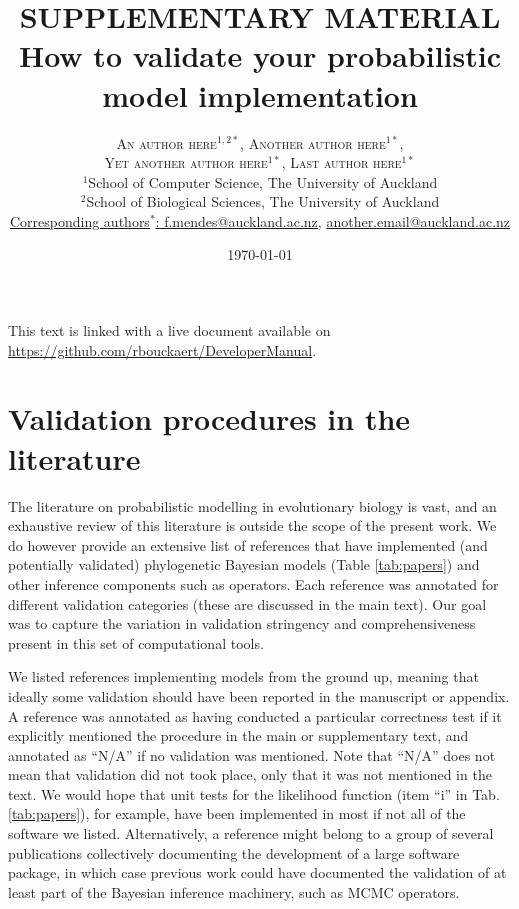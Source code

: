 \documentclass[oneside]{article}
\title{{\huge SUPPLEMENTARY MATERIAL}\\\vspace{.5cm}How to validate your probabilistic model
  implementation} %
\author{\textsc{An author here$^{1,2*}$}, \textsc{Another author
    here$^{1*}$}, \\ \textsc{Yet another author here$^{1*}$},
  \textsc{Last author here$^{1*}$} \\
\small $^1$School of Computer Science, The University of Auckland\\
\small $^2$School of Biological Sciences, The University of Auckland\\
\small
\href{mailto:f.mendes@auckland.ac.nz}{Corresponding authors$^*$: f.mendes@auckland.ac.nz,}
\href{mailto:f.mendes@auckland.ac.nz}{another.email@auckland.ac.nz}
}
\date{\today} %
\begin{document}
\maketitle

\clearpage

This text is linked with a live document available on
\href{https://github.com/rbouckaert/DeveloperManual}{https://github.com/rbouckaert/DeveloperManual}.

\section*{Validation procedures in the literature}

The literature on probabilistic modelling in evolutionary biology is vast,
and an exhaustive review of this literature is outside the
scope of the present work. 
We do however provide an extensive list of references that
have implemented (and potentially validated) phylogenetic Bayesian
models (Table \ref{tab:papers}) and other inference components such as
operators.
Each reference was annotated for different validation categories (these
are discussed in the main text).
Our goal was to capture the variation in validation stringency and
comprehensiveness present in this set of computational tools.

We listed references implementing models from the ground
up, meaning that ideally some validation should have been reported in
the manuscript or appendix.
A reference was annotated as having conducted a particular correctness
test if it explicitly mentioned the procedure in the main or
supplementary text, and annotated as ``N/A'' if no validation was mentioned.
Note that ``N/A'' does not mean that validation did not took place,
only that it was not mentioned in the text.
We would hope that unit tests for the likelihood function (item ``i''
in Tab. \ref{tab:papers}), for example, have been implemented in most
if not all of the software we listed.
Alternatively, a reference might belong to a group of several
publications collectively documenting the development of a large
software package, in which case previous work could have documented 
the validation of at least part of the Bayesian inference machinery,
such as MCMC operators.
\end{document}
